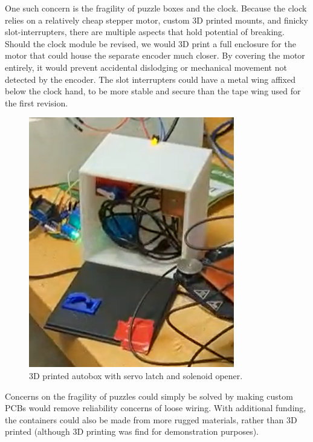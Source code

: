 \documentclass[conference]{IEEEtran}
\begin{document}
\indent One such concern is the fragility of puzzle boxes and the clock. Because the clock relies on a relatively cheap 
stepper motor, custom 3D printed mounts, and finicky slot-interrupters, there are multiple aspects that hold potential 
of breaking. Should the clock module be revised, we would 3D print a full enclosure for the motor that could house the 
separate encoder much closer. By covering the motor entirely, it would prevent accidental dislodging or mechanical 
movement not detected by the encoder. The slot interrupters could have a metal wing affixed below the clock hand, to be 
more stable and secure than the tape wing used for the first revision. 

\begin{figure}[ht]
    \centering
    \includegraphics[width=0.90\columnwidth]{Images/autobox_low_res.png}
    \caption{3D printed autobox with servo latch and solenoid opener.}
    \label{fig:pir}
\end{figure}

\indent Concerns on the fragility of puzzles could simply be solved by making custom PCBs would remove reliability concerns 
of loose wiring. With additional funding, the containers could also be made from more rugged materials, rather than 3D 
printed (although 3D printing was find for demonstration purposes).
\end{document}
